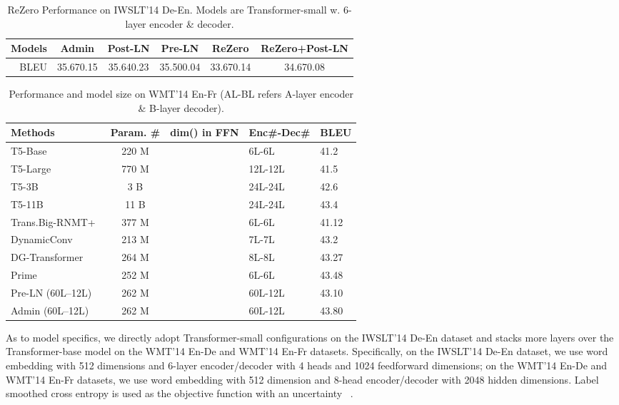 \begin{table}[t]
\centering
\caption{ReZero Performance on IWSLT'14 De-En. Models are Transformer-small w. 6-layer encoder \& decoder.}
\label{tab:rezero}
\begin{tabular}{r|ccccc}
\toprule
Models & Admin & Post-LN & Pre-LN & ReZero & ReZero+Post-LN \\
\midrule
BLEU & 35.670.15 & 35.640.23 & 35.500.04 & 33.670.14 & 34.670.08 \\
\bottomrule
\end{tabular}
\end{table}

\begin{table}[t]
\centering
\caption{Performance and model size on WMT'14 En-Fr (AL-BL refers A-layer encoder \& B-layer decoder).}
\label{tab:wmt14fr}
\begin{tabularx}{\linewidth}{lccYY}
\toprule
Methods & Param. \# & dim() in FFN & Enc\#-Dec\# & BLEU \\
\midrule
T5-Base~\cite{raffel2019exploring} & 220 M &  & 6L-6L & 41.2 \\
T5-Large~\cite{raffel2019exploring} & 770 M &  & 12L-12L & 41.5 \\
T5-3B~\cite{raffel2019exploring} & 3 B &  & 24L-24L & 42.6 \\
T5-11B~\cite{raffel2019exploring} & 11 B &  & 24L-24L & 43.4 \\
\midrule
Trans.Big-RNMT+~\cite{Chen2018TheBO} & 377 M &   & 6L-6L & 41.12 \\
DynamicConv~\cite{wu2018pay} & 213 M &  & 7L-7L & 43.2 \\
DG-Transformer~\cite{Wu2019DepthGF} & 264 M &  & 8L-8L & 43.27 \\
Prime~\cite{zhao2019muse} & 252 M &  & 6L-6L & 43.48 \\
\midrule
Pre-LN (60L--12L) & 262 M &   & 60L-12L & 43.10 \\
Admin (60L--12L) & 262 M &  & 60L-12L & 43.80 \\
\bottomrule
\end{tabularx}
\end{table}

As to model specifics, we directly adopt Transformer-small configurations on the IWSLT'14 De-En dataset and stacks more layers over the Transformer-base model on the WMT'14 En-De and WMT'14 En-Fr datasets.
Specifically, on the IWSLT'14 De-En dataset, we use word embedding with 512 dimensions and 6-layer encoder/decoder with 4 heads and 1024 feedforward dimensions; on the WMT'14 En-De and WMT'14 En-Fr datasets, we use word embedding with 512 dimension and 8-head encoder/decoder with 2048 hidden dimensions. 
Label smoothed cross entropy is used as the objective function with an uncertainty ~\citep{szegedy2016rethinking}. 

